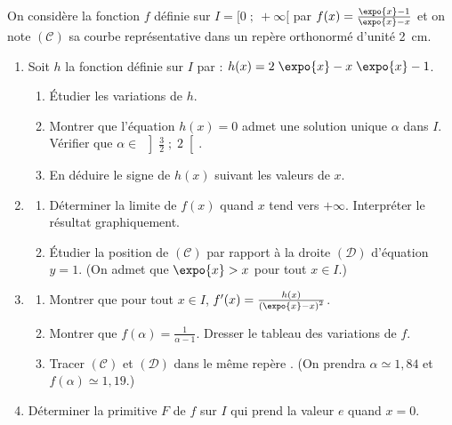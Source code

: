 \begin{exo}
\label{exo:pb exp moins x}
On consid\`ere la fonction $f$ d\'efinie sur $I = [ 0 \; ; \ + \infty[$ par $f(x) = \frac{\expo{x} - 1}{\expo{x} - x}$
et on note $(\mathscr{C})$ sa courbe repr\'esentative dans un rep\`ere orthonorm\'e
\Oij{} d'unit\'e 2~cm.
\begin{enumerate}
\item Soit $h$ la fonction d\'efinie sur $I$ par : $h(x) = 2 \; \expo{x} - x \; \expo{x} - 1$.
      \begin{enumerate}
	      \item \'Etudier les variations de $h$.
      \item Montrer que l'\'equation $h(x) = 0$ admet une solution unique $\alpha$ dans $I$.
            V\'erifier que ${\alpha \in \; \left] \frac{3}{2} \; ; \; 2 \right[}$.
      \item En d\'eduire le signe de $h(x)$ suivant les valeurs de $x$.
      \end{enumerate}
\item \begin{enumerate}
      \item D\'eterminer la limite de $f(x)$ quand $x$ tend vers $+\infty$.
            Interpr\'eter le r\'esultat graphiquement.
      \item \'Etudier la position de $(\mathscr{C})$ par rapport \`a la droite $(\mathcal{D})$ d'\'equation $y = 1$.
            (On admet que $\expo{x} > x $ pour tout $x \in I$.)
      \end{enumerate}
\item \begin{enumerate}
      \item Montrer que pour tout $x \in I$, $f'(x) = \frac{h(x)}{\left(\expo{x} - x \right)^2}$.
      \item Montrer que $f(\alpha) = \frac{1}{\alpha - 1}$.
            Dresser le tableau des variations de $f$.
      \item Tracer $(\mathscr{C})$ et $(\mathcal{D})$ dans le m\^eme rep\`ere \Oij .
            (On prendra $ \alpha \simeq 1{,}84$ et $f(\alpha) \simeq 1{,}19 $.)
      \end{enumerate}
\item D\'eterminer la primitive $F$ de $f$ sur $I$ qui prend la valeur $e$ quand $x = 0$.
\end{enumerate}
\end{exo}
